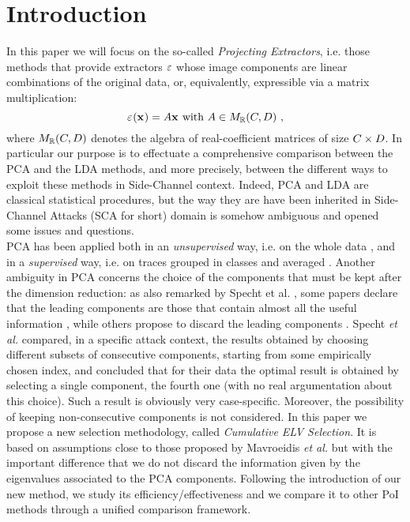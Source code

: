 \section{Introduction}

In this paper we will focus on the so-called {\em Projecting Extractors}, i.e. those methods that provide extractors $\extract$ whose image components are linear combinations of the original data, or, equivalently, expressible via a matrix multiplication:
\begin{equation}
\extractor{\sss[]{}} = A\sss[]{} \mbox{ with } A \in M_{\mathbb{R}}(\newTraceLength, \traceLength) \mbox{ ,}
\end{equation}
where $ M_{\mathbb{R}}(\newTraceLength, \traceLength)$ denotes the algebra of real-coefficient matrices of size $\newTraceLength \times \traceLength$.  In particular our purpose is to effectuate a comprehensive comparison  between the PCA and the LDA methods, and more precisely, between the different ways to exploit these methods in Side-Channel context. Indeed, PCA and LDA are classical statistical procedures, but the way they are have been inherited in Side-Channel Attacks (SCA for short) domain is somehow ambiguous and opened some issues and questions.\\
PCA has been applied both in an {\em unsupervised} way, i.e. on the whole data \cite{Batina2012,karsmakers2009side}, and in a {\em supervised} way, i.e. on traces grouped in classes and averaged \cite{TAprincipal,choudaryefficient,choudary2014efficient,disassembler,Standaert2008}. Another ambiguity in PCA concerns the choice of the components that must be kept after the dimension reduction: as also remarked by Specht et al. \cite{}, some papers declare that the leading components are those that contain almost all the useful information \cite{TAprincipal}, while others propose to discard the leading components \cite{Batina2012}. Specht \textit{et al.} compared, in a specific attack context, the results obtained by choosing different subsets of consecutive components, starting from some empirically chosen index, and concluded that for their data the optimal result is obtained by selecting a single component, the fourth one (with no real argumentation about this choice). Such a result is obviously very case-specific. Moreover, the possibility of keeping non-consecutive components is not considered. In this paper we propose a new selection methodology, called {\em Cumulative ELV Selection}. It is based on assumptions close to those proposed by Mavroeidis \textit{et al.} \cite{SCAclassProbl} but with the important difference that we do not discard the information given by the eigenvalues associated to the PCA components. Following the introduction of our new method, we study its efficiency/effectiveness and we compare it to other PoI methods through a unified comparison framework. \\

